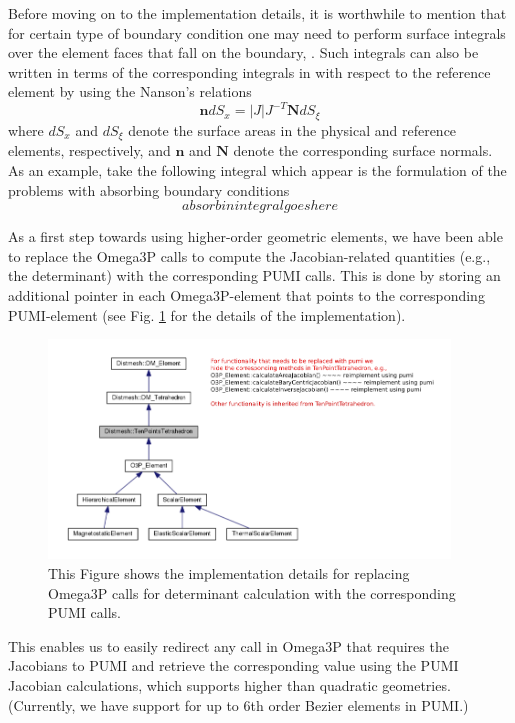\documentclass[review,12pt]{elsarticle_summary_report}
\newcommand{\abs}[1]{\left | #1 \right |}
\begin{document}
Before moving on to the implementation details, it is worthwhile to mention that for certain type of boundary condition one may need to perform surface integrals over the element faces that fall on the boundary, \cite[for example, see the integral in equation nn of ]{LeeLi_09}. Such integrals can also be written in terms of the corresponding integrals in with respect to the reference element by using the Nanson's relations 
\begin{equation}
  \mathbf{n} dS _x = \abs{J} J^{-T}\mathbf{N} dS _\xi
\end{equation}
where $dS_x$ and $dS _{\xi}$ denote the surface areas in the physical and reference elements, respectively, and $\mathbf{n}$ and $\mathbf{N}$ denote the corresponding surface normals. As an example, take the following integral which appear is the formulation of the problems with absorbing boundary conditions
\begin{equation}
	absorbin integral goes here
\end{equation}


As a first step towards using higher-order geometric elements, we have been able to replace the Omega3P calls to compute the Jacobian-related quantities (e.g., the determinant) with the corresponding PUMI calls. This is done by storing an additional pointer in each Omega3P-element that points to the corresponding  PUMI-element (see Fig. \ref{imp} for the details of the implementation).
\begin{figure}[ph!]
\centering
\includegraphics[width=0.95\textwidth]{hide_ten_point_tet.png}
\caption{\label{imp} This Figure shows the implementation details for replacing Omega3P calls for determinant calculation with the corresponding PUMI calls.}
\end{figure}
This enables us to easily redirect any call in Omega3P that requires the Jacobians to PUMI and retrieve the corresponding value using the PUMI Jacobian calculations, which supports higher than quadratic geometries. (Currently, we have support for up to 6th order Bezier elements in PUMI.)
\end{document}
